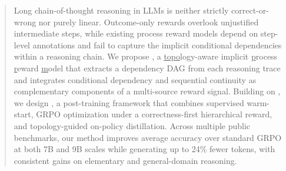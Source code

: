 \begin{abstract}
Long chain-of-thought reasoning in LLMs is neither strictly correct-or-wrong nor purely linear. Outcome-only rewards overlook unjustified intermediate steps, while existing process reward models depend on step-level annotations and fail to capture the implicit conditional dependencies within a reasoning chain.
We propose \method, a \underline{topo}logy-aware implicit \underline{p}rocess \underline{r}eward \underline{m}odel that extracts a dependency DAG from each reasoning trace and integrates conditional dependency and sequential continuity as complementary components of a multi-source reward signal. Building on \method, we design \framework, a post-training framework that combines supervised warm-start, GRPO optimization under a correctness-first hierarchical reward, and topology-guided on-policy distillation.
Across multiple public benchmarks, our method improves average accuracy over standard GRPO at both 7B and 9B scales while generating up to 24\% fewer tokens, with consistent gains on elementary and general-domain reasoning.
\end{abstract}